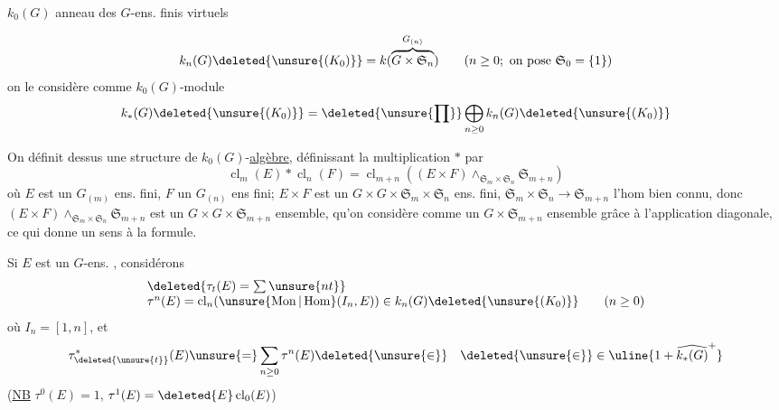 $k_0(G)$ anneau des $G$-ens. finis virtuels

\[
k_n(G)\deleted{\unsure{(K_0)}}=k(\overbrace{G\times\mathfrak S_n}^{G_{(n)}})
\qquad(n\geq0;\ \text{on pose }\mathfrak S_0=\{1\})
\]
on le considère comme $k_0(G)$-module
\[
k_*(G)\deleted{\unsure{(K_0)}}=\deleted{\unsure{\prod}}\bigoplus_{n\geq0}k_n(G)\deleted{\unsure{(K_0)}}
\]

On définit dessus une structure de $k_0(G)$-\uline{algèbre},
 définissant la multiplication $*$ par
\[
\operatorname{cl}_m(E)*\operatorname{cl}_n(F)=\operatorname{cl}_{m+n}((E\times F)\mathbin{\wedge}_{\mathfrak S_m\times\mathfrak S_n}\mathfrak S_{m+n})
\]
où $E$ est un $G_{(m)}$ ens. fini, $F$ un $G_{(n)}$ ens fini;
$E\times F$ est un $G\times G\times\mathfrak S_m\times\mathfrak S_n$ ens. fini,
$\mathfrak S_m\times\mathfrak S_n\longrightarrow\mathfrak S_{m+n}$ l'hom bien connu,
donc $(E\times F)\mathbin{\wedge}_{\mathfrak S_m\times\mathfrak S_n}\mathfrak S_{m+n}$ est un $G\times G\times\mathfrak S_{m+n}$
ensemble, qu'on considère comme un $G\times\mathfrak S_{m+n}$
ensemble grâce à l'application diagonale, ce qui
donne un sens à la formule.

Si $E$ est un $G$-ens. , considérons
\[
\begin{array}{l}\deleted{\tau_t(E)=\sum\unsure{nt}}\\
\tau^n(E)=\operatorname{cl}_n(\unsure{\operatorname{Mon}|\operatorname{Hom}}(I_n,E))\in k_n(G)\deleted{\unsure{(K_0)}}\qquad(n\geq0)\end{array}
\]
où $I_n=[1,n]$, et
\[
\tau^*_{\deleted{\unsure{t}}}(E)\unsure{=}\sum_{n\geq0}\tau^n(E)\deleted{\unsure{\in}}\quad\deleted{\unsure{\in}}\in\uline{1+\widehat{k_*(G)}^+}
\]
(\uline{NB} $\tau^0(E)=1$, $\tau^1(E)=\deleted{E}\operatorname{cl}_0(E)$)

